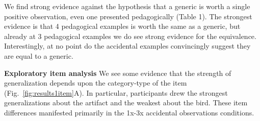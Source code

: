 \documentclass[10pt,letterpaper]{article}
\begin{document}
We find strong evidence against the hypothesis that a generic is worth a single positive observation, even one presented pedagogically (Table 1).
The strongest evidence is that 4 pedagogical examples is worth the same as a generic, but already at 3 pedagogical examples we do see strong evidence for the equivalence. 
Interestingly, at no point do the accidental examples convincingly suggest they are equal to a generic.





\noindent\textbf{Exploratory item analysis}
We see some evidence that the strength of generalization depends upon the category-type of the item (Fig.~\ref{fig:results1item}A).
In particular, participants drew the strongest generalizations about the artifact and the weakest about the bird. 
These item differences manifested primarily in the 1x-3x accidental observations conditions. 
\end{document}
